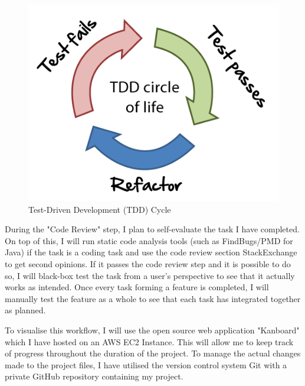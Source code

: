 \documentclass[]{report}
\begin{document}
	\begin{figure}[h!]
		\caption{
			Test-Driven Development (TDD) Cycle
			\cite{TDD Diagram}
		}
		\centering
		\includegraphics[scale=0.5]{tdd-circle-of-life.png}
	\end{figure}
		
	During the "Code Review" step, I plan to self-evaluate the task I have completed. On top of this, I will run static code analysis tools (such as FindBugs/PMD for Java) if the task is a coding task and use the code review section StackExchange to get second opinions. If it passes the code review step and it is possible to do so, I will black-box test the task from a user's perspective to see that it actually works as intended. Once every task forming a feature is completed, I will manually test the feature as a whole to see that each task has integrated together as planned.
		
	To visualise this workflow, I will use the open source web application "Kanboard" which I have hosted on an AWS EC2 Instance. This will allow me to keep track of progress throughout the duration of the project. To manage the actual changes made to the project files, I have utilised the version control system Git with a private GitHub repository containing my project.
		
\end{document}
